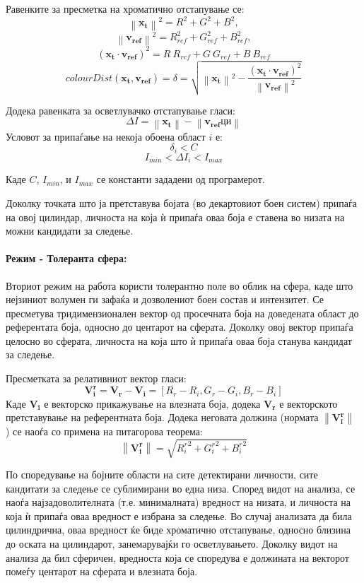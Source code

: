 \documentclass[12pt]{article}
\newcommand\norm[1]{\left\lVert#1\right\rVert}
\renewcommand{\vec}[1]{\mathbf{#1}}
\begin{document}
        Равенките за пресметка на хроматично отстапување се:
        $$  \norm{\vec{x_t}}^2 = R^2 + G^2 + B^2,$$
        $$  \norm{\vec{v_{ref}}}^2 = R_{ref}^2 + G_{ref}^2 + B_{ref}^2, $$
        $$    (\vec{x_t} \cdot \vec{v_{ref}})^2 = R\ R_{ref} + G\ G_{ref} + B\ B_{ref} $$
        $$    colourDist(\vec{x_t}, \vec{v_{ref}}) = \delta = \sqrt{\norm{\vec{x_t}}^2 - \frac{(\vec{x_t} \cdot \vec{v_{ref}})^2}{\norm{\vec{v_{ref}}}^2}} $$
        \bigbreak

        Додека равенката за осветлувачко отстапување гласи:
        $$ \Delta I = \norm{\vec{x_t}} - \norm{\vec{v_{ref}} ци} $$
        \bigbreak
        Условот за припаѓање на некоја обоена област $i$ е:
        $$ \delta_{i} < C $$
        $$ I_{min}< \Delta I_i < I_{max} $$

        Каде $C$, $I_{min}$, и $I_{max}$ се константи зададени од програмерот.

        Доколку точката што ја претставува бојата (во декартовиот боен систем) припаѓа на овој цилиндар, личноста на која ѝ припаѓа оваа боја е ставена во низата на можни кандидати за следење.

      \paragraph{Режим - Толеранта сфера:\\}
        Вториот режим на работа користи толерантно поле во облик на сфера, каде што нејзиниот волумен ги зафаќа и дозволениот боен состав и интензитет. Се пресметува тридимензионален вектор од просечната боја на доведената област до референтата боја, односно до центарот на сферата. Доколку овој вектор припаѓа целосно во сферата, личноста на која што ѝ припаѓа оваа боја станува кандидат за следење.

        Пресметката за релативниот вектор гласи:
        $$ \vec{V_i^r} = \vec{V_r} - \vec{V_i}= [R_r - R_i, G_r - G_i, B_r - B_i] $$
        Каде $\vec{V_i}$ е векторско прикажување на влезната боја, додека $\vec{V_r}$ е векторското претставување на референтната боја.
        Додека неговата должина (нормата $\norm{\vec{V_i^r}}$ ) се наоѓа со примена на питагорова теорема:
        $$ \norm{\vec{V_i^r}} = \sqrt{{R_i^r}^2 + {G_i^r}^2 + {B_i^r}^2} $$

        По споредување на бојните области на сите детектирани личности, сите кандитати за следење се сублимирани во една низа. Според видот на анализа, се наоѓа најзадоволителната (т.е. минималната) вредност на низата, и личноста на која ѝ припаѓа оваа вредност е избрана за следење. Во случај анализата да била цилиндрична, оваа вредност ќе биде хроматично отстапување, односно близина до оската на цилиндарот, занемарувајќи го осветлувањето. Доколку видот на анализа да бил сферичен, вредноста која се споредува е должината на векторот помеѓу центарот на сферата и влезната боја.
\end{document}
